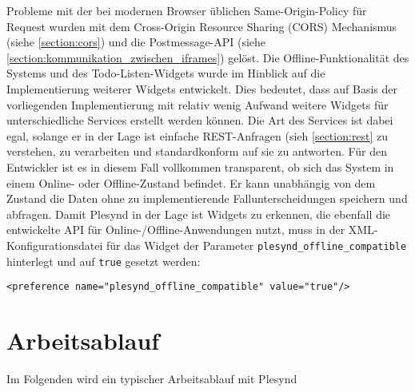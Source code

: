 Probleme mit der bei modernen Browser üblichen Same-Origin-Policy für Request wurden mit dem Cross-Origin Resource Sharing (CORS) Mechanismus (siehe \ref{section:cors}) und die Postmessage-API (siehe \ref{section:kommunikation_zwischen_iframes}) gelöst. Die Offline-Funktionalität des Systems und des Todo-Listen-Widgets wurde im Hinblick auf die Implementierung weiterer Widgets entwickelt. Dies bedeutet, dass auf Basis der vorliegenden Implementierung mit relativ wenig Aufwand weitere Widgets für unterschiedliche Services erstellt werden können. Die Art des Services ist dabei egal, solange er in der Lage ist einfache REST-Anfragen (sieh \ref{section:rest} zu verstehen, zu verarbeiten und standardkonform auf sie zu antworten. Für den Entwickler ist es in diesem Fall vollkommen transparent, ob sich das System in einem Online- oder Offline-Zustand befindet. Er kann unabhängig von dem Zustand die Daten ohne zu implementierende Fallunterscheidungen speichern und abfragen. Damit Plesynd in der Lage ist Widgets zu erkennen, die ebenfall die entwickelte API für Online-/Offline-Anwendungen nutzt, muss in der XML-Konfigurationsdatei für das Widget der Parameter \texttt{plesynd\_offline\_compatible} hinterlegt und auf \texttt{true} gesetzt werden:
\begin{lstlisting}
<preference name="plesynd_offline_compatible" value="true"/>
\end{lstlisting}

\section{Arbeitsablauf}
Im Folgenden wird ein typischer Arbeitsablauf mit Plesynd





